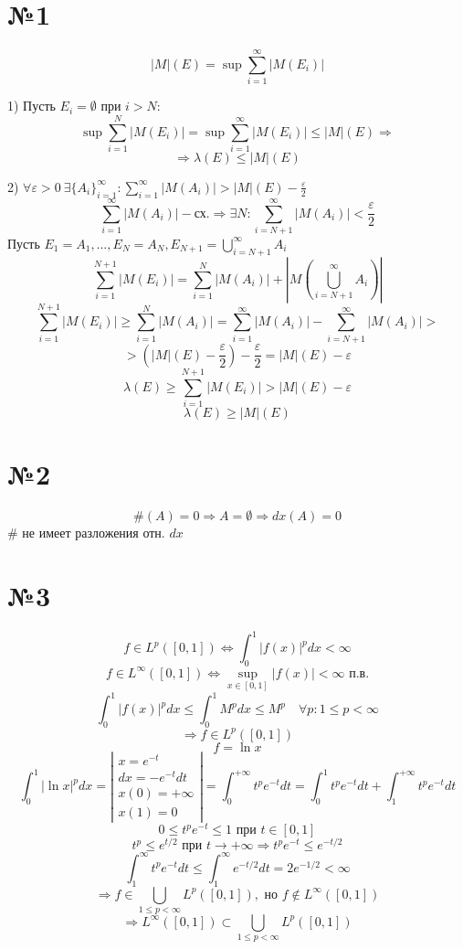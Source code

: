 \documentclass{article}
\begin{document}
\section*{№1}

\[ |M|(E) = \sup \sum_{i=1}^{\infty} |M(E_i)| \]

1) Пусть \(E_i = \emptyset\) при \(i > N\):
\[ \sup \sum_{i=1}^{N} |M(E_i)| = \sup \sum_{i=1}^{\infty} |M(E_i)| \le |M|(E) \Rightarrow \]
\[ \Rightarrow \lambda(E) \le |M|(E) \]

2) \(\forall \varepsilon > 0 \ \exists \{A_i\}_{i=1}^{\infty} : \sum_{i=1}^{\infty} |M(A_i)| > |M|(E) - \frac{\varepsilon}{2}\)
\[ \sum_{i=1}^{\infty} |M(A_i)| - \text{сх.} \Rightarrow \exists N: \sum_{i=N+1}^{\infty} |M(A_i)| < \frac{\varepsilon}{2} \]
Пусть \(E_1 = A_1, \dots, E_N = A_N, E_{N+1} = \bigcup_{i=N+1}^{\infty} A_i\)
\[ \sum_{i=1}^{N+1} |M(E_i)| = \sum_{i=1}^{N} |M(A_i)| + |M(\bigcup_{i=N+1}^{\infty} A_i)| \]
\[ \sum_{i=1}^{N+1} |M(E_i)| \ge \sum_{i=1}^{N} |M(A_i)| = \sum_{i=1}^{\infty} |M(A_i)| - \sum_{i=N+1}^{\infty} |M(A_i)| > \]
\[ > (|M|(E) - \frac{\varepsilon}{2}) - \frac{\varepsilon}{2} = |M|(E) - \varepsilon \]
\[ \lambda(E) \ge \sum_{i=1}^{N+1} |M(E_i)| > |M|(E) - \varepsilon \]
\[ \lambda(E) \ge |M|(E) \]

\section*{№2}

\[ \#(A) = 0 \Rightarrow A = \emptyset \Rightarrow dx(A) = 0 \]
\(\#\) не имеет разложения отн. \(dx\)

\section*{№3}

\[ f \in L^p([0, 1]) \Leftrightarrow \int_0^1 |f(x)|^p dx < \infty \]
\[ f \in L^{\infty}([0, 1]) \Leftrightarrow \sup_{x \in [0, 1]} |f(x)| < \infty \text{ п.в.} \]
\[ \int_0^1 |f(x)|^p dx \le \int_0^1 M^p dx \le M^p \quad \forall p : 1 \le p < \infty \]
\[ \Rightarrow f \in L^p([0, 1]) \]
\[ f = \ln x \]
\[ \int_0^1 |\ln x|^p dx = \left| \begin{array}{l} x = e^{-t} \\ dx = -e^{-t} dt \\ x(0) = +\infty \\ x(1) = 0 \end{array} \right| = \int_0^{+\infty} t^p e^{-t} dt = \int_0^1 t^p e^{-t} dt + \int_1^{+\infty} t^p e^{-t} dt \]
\[ 0 \le t^p e^{-t} \le 1 \text{ при } t \in [0, 1] \]
\[ t^p \le e^{t/2} \text{ при } t \to +\infty \Rightarrow t^p e^{-t} \le e^{-t/2} \]
\[ \int_1^{\infty} t^p e^{-t} dt \le \int_1^{\infty} e^{-t/2} dt = 2e^{-1/2} < \infty \]
\[ \Rightarrow f \in \bigcup_{1 \le p < \infty} L^p([0, 1]), \text{ но } f \notin L^{\infty}([0, 1]) \]
\[ \Rightarrow L^{\infty}([0, 1]) \subset \bigcup_{1 \le p < \infty} L^p([0, 1]) \]
\end{document}
